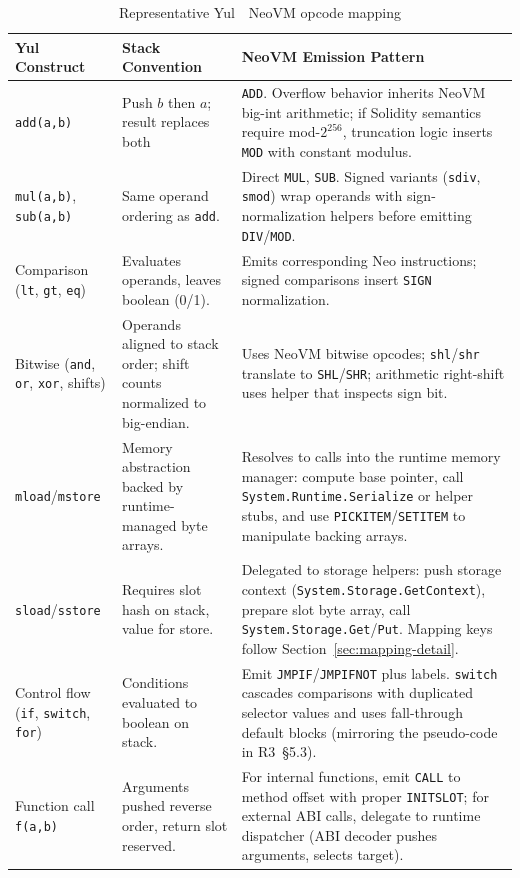\documentclass[11pt]{article}
\begin{document}
\begin{table}[H]
\centering
\caption{Representative Yul~\textrightarrow~NeoVM opcode mapping}
\begin{tabularx}{\textwidth}{@{}p{}p{}X@{}}
\toprule
Yul Construct & Stack Convention & NeoVM Emission Pattern \\
\midrule
\texttt{add(a,b)} & Push \(b\) then \(a\); result replaces both & \texttt{ADD}. Overflow behavior inherits NeoVM big-int arithmetic; if Solidity semantics require mod-\(2^{256}\), truncation logic inserts \texttt{MOD} with constant modulus.\\
\texttt{mul(a,b)}, \texttt{sub(a,b)} & Same operand ordering as \texttt{add}. & Direct \texttt{MUL}, \texttt{SUB}. Signed variants (\texttt{sdiv}, \texttt{smod}) wrap operands with sign-normalization helpers before emitting \texttt{DIV}/\texttt{MOD}.\\
Comparison (\texttt{lt}, \texttt{gt}, \texttt{eq}) & Evaluates operands, leaves boolean (0/1). & Emits corresponding Neo instructions; signed comparisons insert \texttt{SIGN} normalization.\\
Bitwise (\texttt{and}, \texttt{or}, \texttt{xor}, shifts) & Operands aligned to stack order; shift counts normalized to big-endian. & Uses NeoVM bitwise opcodes; \texttt{shl}/\texttt{shr} translate to \texttt{SHL}/\texttt{SHR}; arithmetic right-shift uses helper that inspects sign bit.\\
\texttt{mload}/\texttt{mstore} & Memory abstraction backed by runtime-managed byte arrays. & Resolves to calls into the runtime memory manager: compute base pointer, call \texttt{System.Runtime.Serialize} or helper stubs, and use \texttt{PICKITEM}/\texttt{SETITEM} to manipulate backing arrays.\\
\texttt{sload}/\texttt{sstore} & Requires slot hash on stack, value for store. & Delegated to storage helpers: push storage context (\texttt{System.Storage.GetContext}), prepare slot byte array, call \texttt{System.Storage.Get}/\texttt{Put}. Mapping keys follow Section~\ref{sec:mapping-detail}.\\
Control flow (\texttt{if}, \texttt{switch}, \texttt{for}) & Conditions evaluated to boolean on stack. & Emit \texttt{JMPIF}/\texttt{JMPIFNOT} plus labels. \texttt{switch} cascades comparisons with duplicated selector values and uses fall-through default blocks (mirroring the pseudo-code in R3~\S5.3).\\
Function call \texttt{f(a,b)} & Arguments pushed reverse order, return slot reserved. & For internal functions, emit \texttt{CALL} to method offset with proper \texttt{INITSLOT}; for external ABI calls, delegate to runtime dispatcher (ABI decoder pushes arguments, selects target).\\

\end{tabularx}
\end{table}
\end{document}
